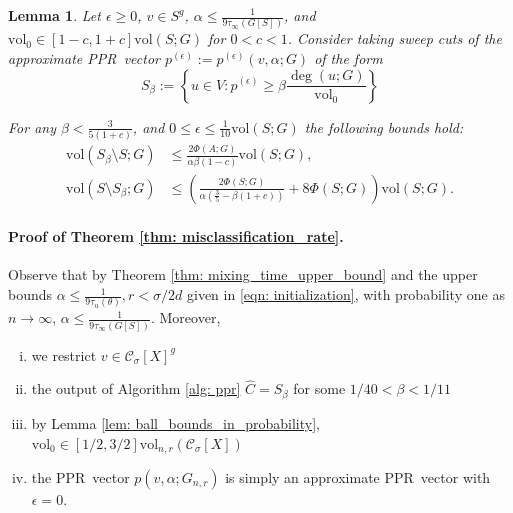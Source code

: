 \documentclass{article}
\newcommand{\vol}{\mathrm{vol}}
\newcommand{\1}{\mathbf{1}}
\newcommand{\pbf}{p}        %
\newcommand{\Xbf}{X}             %
\newcommand{\Cset}{\mathcal{C}}
\newcommand{\Csig}{\Cset_{\sigma}}
\newcommand{\pprspace}{{\sc PPR~}}
\theoremstyle{aldenthm}
\newtheorem{lemma}{Lemma}
\theoremstyle{aldenrmrk}
\begin{document}
\begin{lemma}
	\label{lem: zhu}
	Let $\epsilon \geq 0$, $v \in S^g$, $\alpha \leq \frac{1}{9\tau_{\infty}(G[S])}$, and $\vol_0 \in [1 - c,1 + c] \vol(S;G)$ for $0 < c < 1$. Consider taking sweep cuts of the approximate \pprspace vector $\pbf^{(\epsilon)} := \pbf^{(\epsilon)}(v,\alpha; G)$ of the form
	\begin{equation*}
	S_{\beta} := \left\{u \in V: \pbf^{(\epsilon)} \geq \beta \frac{\deg(u; G)}{\vol_0} \right\}
	\end{equation*}
	
	For any $\beta < \frac{3}{5(1 + c)}$, and $0 \leq \epsilon \leq \frac{1}{10} \vol(S;G)$ the following bounds hold:
	\begin{align}
	\vol(S_{\beta} \setminus S; G) & \leq \frac{2\Phi(A;G)}{\alpha \beta(1 - c)} \vol(S; G), \label{eqn: zhu_1}\\
	\vol(S \setminus S_{\beta}; G) & \leq \left(\frac{2\Phi(S;G)}{\alpha (\frac{3}{5} - \beta(1 + c))} + 8\Phi(S;G)\right)\vol(S; G).  \label{eqn: zhu_2}
	\end{align}
\end{lemma}

\paragraph{Proof of Theorem \ref{thm: misclassification_rate}.}

Observe that by Theorem \ref{thm: mixing_time_upper_bound} and the upper bounds $\alpha \leq \frac{1}{9 \tau_u(\theta)}, r < \sigma/2d$ given in \eqref{eqn: initialization}, with probability one as $n \to \infty$, $\alpha \leq \frac{1}{9\tau_{\infty}(G[S])}$. Moreover, 
\begin{enumerate}[(i)]
	\item we restrict $v \in \Csig[\Xbf]^g$
	\item the output of Algorithm \ref{alg: ppr} $\widehat{C} = S_{\beta}$ for some $1/40 < \beta < 1/11$
	\item by Lemma \ref{lem: ball_bounds_in_probability}, $\vol_0 \in [1/2,3/2]\vol_{n,r}(\Csig[\Xbf])$
	\item the \pprspace vector $\pbf(v,\alpha;G_{n,r})$ is simply an approximate \pprspace vector with $\epsilon = 0$.
\end{enumerate}
\end{document}
